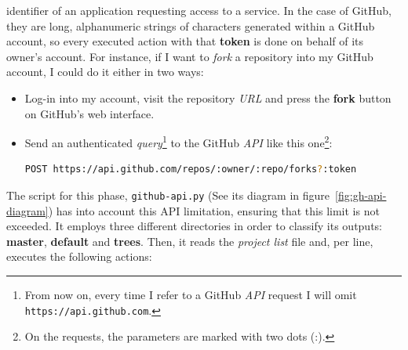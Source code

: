 \documentclass[a4paper, 12pt]{book}
\begin{document}
identifier of an application requesting access to a service.
In the case of GitHub, they are long, alphanumeric strings of characters generated within a GitHub account,
so every executed action with that \textbf{token} is done on behalf of its owner's account.
For instance, if I want to \textit{fork} a repository into my GitHub account, I could do it either in two ways:
\begin{itemize}
  \item Log-in into my account, visit the repository \emph{URL} and press the \textbf{fork} button on GitHub's web interface.
  \item Send an authenticated \textit{query}\footnote{From now on, every time I refer to a GitHub \textit{API}
  request I will omit \texttt{https://api.github.com}.}
  to the GitHub \textit{API} like this one\footnote{On the requests, the parameters are marked with two dots (:).}:
  \begin{lstlisting}[language=bash]
  POST https://api.github.com/repos/:owner/:repo/forks?:token \end{lstlisting}
\end{itemize}
The script for this phase, \texttt{github-api.py} (See its diagram in figure~\ref{fig:gh-api-diagram}) has into account
this API limitation, ensuring that this limit is not exceeded. It employs three different directories in order to classify its outputs:
\textbf{master}, \textbf{default} and \textbf{trees}.
Then, it reads the \emph{project list} file and, per line, executes the following actions:
\end{document}
